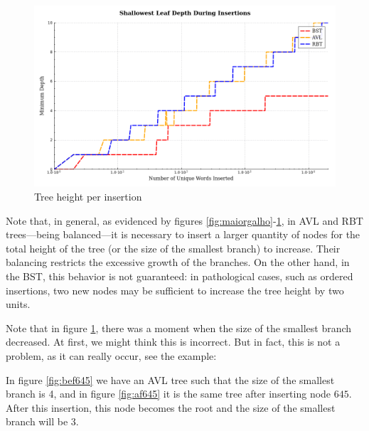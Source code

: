 \begin{figure}[H]
    \centering
    \includegraphics[width=0.75\linewidth]{img/Graph_2_10103.pdf}
    \caption{Tree height per insertion}
    \label{fig:menorgalho}
\end{figure}

Note that, in general, as evidenced by figures \ref{fig:maiorgalho}-\ref{fig:menorgalho}, in AVL and RBT trees—being balanced—it is necessary to insert a larger quantity
of nodes for the total height of the tree (or the size of the smallest branch) to increase. Their balancing restricts the excessive growth of the branches.
On the other hand, in the BST, this behavior is not guaranteed: in pathological cases, such as ordered insertions,
two new nodes may be sufficient to increase the tree height by two units.

Note that in figure \ref{fig:menorgalho}, there was a moment when the size of the smallest branch decreased. At first,
we might think this is incorrect. But in fact, this is not a problem,
as it can really occur, see the example:

In figure \ref{fig:bef645} we have an AVL tree such that the size of the smallest branch is 4, and in figure
\ref{fig:af645} it is the same tree after inserting node $645$. After this insertion,
this node becomes the root and the size of the smallest branch will be 3.

